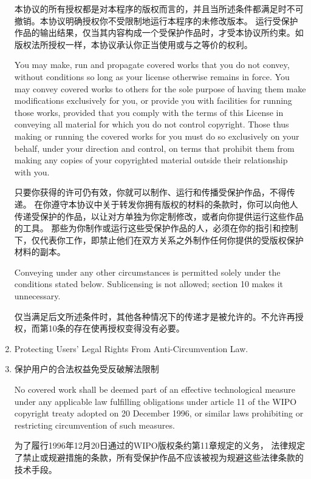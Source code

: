 \documentclass[11pt]{article}
\begin{document}
\begin{enumerate}
        本协议的所有授权都是对本程序的版权而言的，并且当所述条件都满足时不可撤销。本协议明确授权你不受限制地运行本程序的未修改版本。
        运行受保护作品的输出结果，仅当其内容构成一个受保护作品时，才受本协议所约束。如版权法所授权一样，本协议承认你正当使用或与之等价的权利。


        You may make, run and propagate covered works that you do not
        convey, without conditions so long as your license otherwise remains
        in force.  You may convey covered works to others for the sole purpose
        of having them make modifications exclusively for you, or provide you
        with facilities for running those works, provided that you comply with
        the terms of this License in conveying all material for which you do
        not control copyright.  Those thus making or running the covered works
        for you must do so exclusively on your behalf, under your direction
        and control, on terms that prohibit them from making any copies of
        your copyrighted material outside their relationship with you.

        只要你获得的许可仍有效，你就可以制作、运行和传播受保护作品，不得传递。
        在你遵守本协议中关于转发你拥有版权的材料的条款时，你可以向他人传递受保护的作品，以让对方单独为你定制修改，或者向你提供运行这些作品的工具。
        那些为你制作或运行这些受保护作品的人，必须在你的指引和控制下，仅代表你工作，即禁止他们在双方关系之外制作任何你提供的受版权保护材料的副本。


        Conveying under any other circumstances is permitted solely under
        the conditions stated below.  Sublicensing is not allowed; section 10
        makes it unnecessary.

        仅当满足后文所述条件时，其他各种情况下的传递才是被允许的。不允许再授权，而第10条的存在使再授权变得没有必要。

  \item Protecting Users' Legal Rights From Anti-Circumvention Law.
  \item 保护用户的合法权益免受反破解法限制

        No covered work shall be deemed part of an effective technological
        measure under any applicable law fulfilling obligations under article
        11 of the WIPO copyright treaty adopted on 20 December 1996, or
        similar laws prohibiting or restricting circumvention of such
        measures.

        为了履行1996年12月20日通过的WIPO版权条约第11章规定的义务，
        法律规定了禁止或规避措施的条款，所有受保护作品不应该被视为规避这些法律条款的技术手段。


\end{enumerate}
\end{document}
